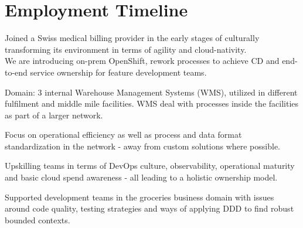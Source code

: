 \documentclass[]{resume}
\begin{document}
\begin{minipage}[t]{0.64\textwidth} 


\section{Employment Timeline}

\vspace{\topsep} %
Joined a Swiss medical billing provider in the early stages of culturally transforming its environment in terms of agility and cloud-nativity.\\
We are introducing on-prem OpenShift, rework processes to achieve CD and end-to-end service ownership for feature development teams.
\sectionsep

\vspace{\topsep} %
\begin{tightemize}
\item Domain: 3 internal Warehouse Management Systems (WMS), utilized in different fulfilment and middle mile facilities. WMS deal with processes inside the facilities as part of a larger network.
\item Focus on operational efficiency as well as process and data format standardization in the network - away from custom solutions where possible.
\item Upskilling teams in terms of DevOps culture, observability, operational maturity and basic cloud spend awareness - all leading to a holistic ownership model.
\end{tightemize}
\sectionsep

\vspace{\topsep} %
Supported development teams in the groceries business domain with issues around code quality, testing strategies and ways of applying DDD to find robust bounded contexts.
\sectionsep


\end{minipage}
\end{document}
